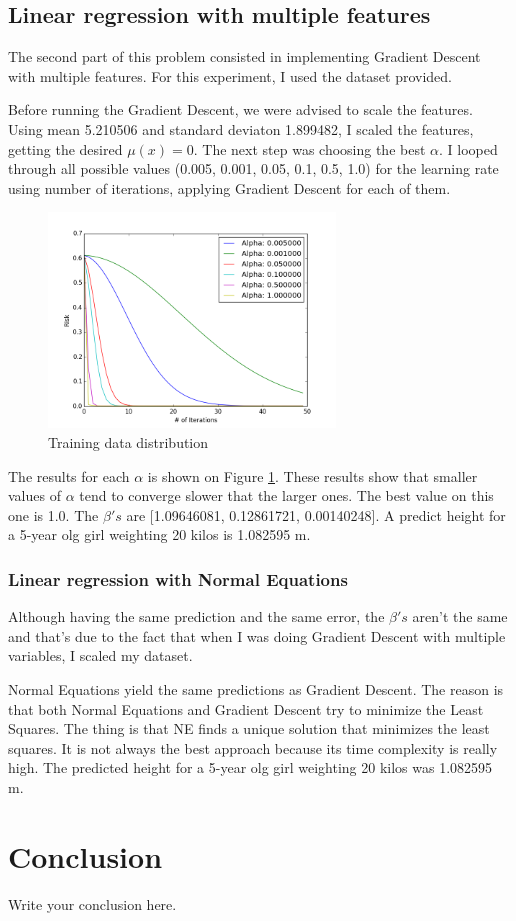 \documentclass{article}
\begin{document}
\subsection{Linear regression with multiple features}
The second part of this problem consisted in implementing Gradient Descent with multiple features. For this experiment, I used the  dataset provided.

Before running the Gradient Descent, we were advised to scale the features. Using mean 5.210506 and standard deviaton 1.899482, I scaled the features, getting the desired $\mu(x) = 0$. The next step was choosing the best $\alpha$. I looped through all possible values (0.005, 0.001, 0.05, 0.1, 0.5, 1.0) for the learning rate using number of iterations, applying Gradient Descent for each of them.

\begin{figure}[htb]
    \centering
    \includegraphics[width=3.0in]{p1_alpha_convergence}
    \caption{Training data distribution}
    \label{costfunction}
\end{figure}

The results for each $\alpha$ is shown on Figure \ref{costfunction}. These results show that smaller values of $\alpha$ tend to converge slower that the larger ones. The best value on this one is 1.0. The $\beta's$ are [1.09646081, 0.12861721, 0.00140248]. A predict height for a 5-year olg girl weighting 20 kilos is 1.082595 m.

\subsubsection{Linear regression with Normal Equations}
Although having the same prediction and the same error, the $\beta's$ aren't the same and that's due to the fact that when I was doing Gradient Descent with multiple variables, I scaled my dataset.

Normal Equations yield the same predictions as Gradient Descent. The reason is that both Normal Equations and Gradient Descent try to minimize the Least Squares. The thing is that NE finds a unique solution that minimizes the least squares. It is not always the best approach because its time complexity is really high. The predicted height for a 5-year olg girl weighting 20 kilos was 1.082595 m.


\section{Conclusion}
Write your conclusion here.
\end{document}
